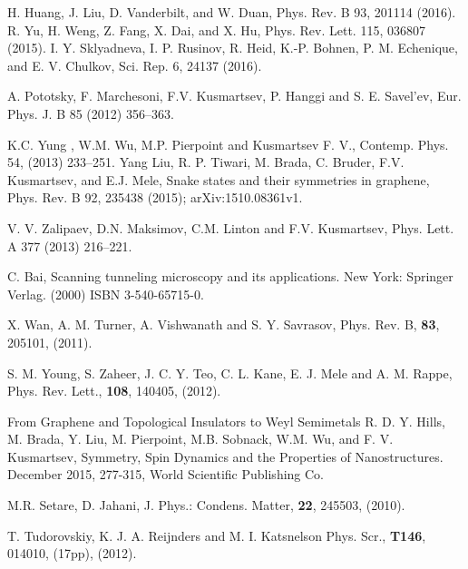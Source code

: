 \documentclass[prb,twocolumn,aps,superscriptaddress,showpacs,floatfix]{revtex4}
\begin{document}
\begin{thebibliography}{10}
  H. Huang, J. Liu, D. Vanderbilt, and W. Duan, Phys. Rev. B
93, 201114 (2016).
 R. Yu, H. Weng, Z. Fang, X. Dai, and X. Hu, Phys. Rev. Lett.
115, 036807 (2015).
 I. Y. Sklyadneva, I. P. Rusinov, R. Heid, K.-P. Bohnen, P. M.
Echenique, and E. V. Chulkov, Sci. Rep. 6, 24137 (2016).


 A. Pototsky, F. Marchesoni, F.V. Kusmartsev, P. Hanggi and S. E. Savel'ev, Eur. Phys. J. B 85 (2012) 356--363.

  K.C. Yung , W.M. Wu, M.P. Pierpoint and Kusmartsev F. V., Contemp. Phys. 54, (2013) 233--251.
 Yang Liu, R. P. Tiwari, M. Brada, C. Bruder, F.V. Kusmartsev, and E.J. Mele, Snake states and their symmetries in graphene, Phys. Rev. B 92, 235438 (2015); arXiv:1510.08361v1. 

 V. V. Zalipaev, D.N. Maksimov, C.M. Linton and  F.V. Kusmartsev, Phys. Lett. A 377 (2013) 216--221.

 C. Bai,  Scanning tunneling microscopy and its applications. New York: Springer Verlag. (2000) ISBN 3-540-65715-0.

X. Wan, A. M. Turner, A. Vishwanath and S. Y. Savrasov,
Phys. Rev. B, {\bf 83}, 205101, (2011).

S. M. Young, S. Zaheer, J. C. Y. Teo, C. L. Kane, E. J. Mele and A. M. Rappe,
Phys. Rev. Lett., {\bf 108}, 140405, (2012).


From Graphene and Topological Insulators to Weyl Semimetals
R. D. Y. Hills, M. Brada, Y. Liu, M. Pierpoint, M.B. Sobnack, W.M. Wu, and F. V. Kusmartsev,
Symmetry, Spin Dynamics and the Properties of Nanostructures. December 2015, 277-315,
World Scientific Publishing Co.


M.R. Setare, D. Jahani,
\newblock J. Phys.: Condens. Matter, {\bf 22}, 245503, (2010).

T. Tudorovskiy, K. J. A. Reijnders and M. I. Katsnelson
Phys. Scr., {\bf T146}, 014010, (17pp), (2012).


\end{thebibliography}
\end{document}
